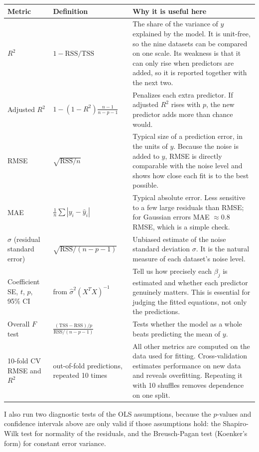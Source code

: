 \documentclass[11pt]{article}
\begin{document}
\begin{center}\small
\begin{tabular}{p{3.2cm}p{4.6cm}p{6.6cm}}
\toprule
Metric & Definition & Why it is useful here\\
\midrule
$R^2$ & $1 - \text{RSS}/\text{TSS}$ & The share of the variance of $y$ explained by the model. It is unit-free, so the nine datasets can be compared on one scale. Its weakness is that it can only rise when predictors are added, so it is reported together with the next two.\\
Adjusted $R^2$ & $1 - (1-R^2)\frac{n-1}{n-p-1}$ & Penalizes each extra predictor. If adjusted $R^2$ rises with $p$, the new predictor adds more than chance would.\\
RMSE & $\sqrt{\text{RSS}/n}$ & Typical size of a prediction error, in the units of $y$. Because the noise is added to $y$, RMSE is directly comparable with the noise level and shows how close each fit is to the best possible.\\
MAE & $\frac1n\sum|y_i - \hat y_i|$ & Typical absolute error. Less sensitive to a few large residuals than RMSE; for Gaussian errors MAE $\approx 0.8\,$RMSE, which is a simple check.\\
$\hat\sigma$ (residual standard error) & $\sqrt{\text{RSS}/(n-p-1)}$ & Unbiased estimate of the noise standard deviation $\sigma$. It is the natural measure of each dataset's noise level.\\
Coefficient SE, $t$, $p$, 95\% CI & from $\hat\sigma^2 (X^TX)^{-1}$ & Tell us how precisely each $\beta_j$ is estimated and whether each predictor genuinely matters. This is essential for judging the fitted equations, not only the predictions.\\
Overall $F$ test & $\frac{(\text{TSS}-\text{RSS})/p}{\text{RSS}/(n-p-1)}$ & Tests whether the model as a whole beats predicting the mean of $y$.\\
10-fold CV RMSE and $R^2$ & out-of-fold predictions, repeated 10 times & All other metrics are computed on the data used for fitting. Cross-validation estimates performance on new data and reveals overfitting. Repeating it with 10 shuffles removes dependence on one split.\\
\bottomrule
\end{tabular}
\end{center}

I also run two diagnostic tests of the OLS assumptions, because the $p$-values and confidence intervals above are only valid if those assumptions hold: the Shapiro-Wilk test \cite{sw} for normality of the residuals, and the Breusch-Pagan test (Koenker's form) \cite{bp} for constant error variance.
\end{document}
